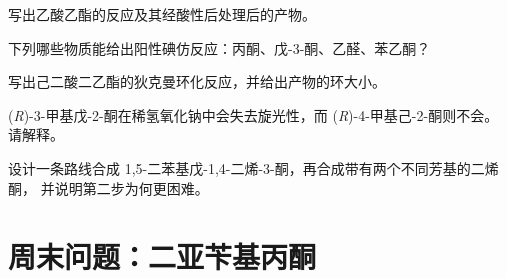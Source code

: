 \begin{exercise}[$\star\star$]\label{exo:b2:enolates-aldol:8}
写出乙酸乙酯的反应及其经酸性后处理后的产物。
\end{exercise}

\begin{exercise}[$\star\star$]\label{exo:b2:enolates-aldol:9}
下列哪些物质能给出阳性碘仿反应：丙酮、戊-3-酮、乙醛、苯乙酮？
\end{exercise}

\begin{exercise}[$\star\star\star$]\label{exo:b2:enolates-aldol:10}
写出己二酸二乙酯的狄克曼环化反应，并给出产物的环大小。
\end{exercise}

\begin{exercise}[$\star\star\star$]\label{exo:b2:enolates-aldol:11}
(\textit{R})-3-甲基戊-2-酮在稀氢氧化钠中会失去旋光性，而
(\textit{R})-4-甲基己-2-酮则不会。请解释。
\end{exercise}

\begin{exercise}[$\star\star\star$]\label{exo:b2:enolates-aldol:12}
设计一条路线合成 1,5-二苯基戊-1,4-二烯-3-酮，再合成带有两个不同芳基的二烯酮，
并说明第二步为何更困难。
\end{exercise}

\section{周末问题：二亚苄基丙酮}

